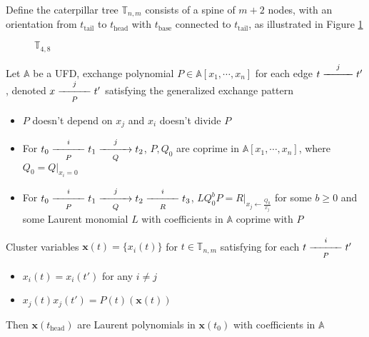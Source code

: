 \documentclass[main]{subfiles}
\begin{document}
\begin{lemma}\label{Caterpillar lemma}
Define the caterpillar tree $\mathbb T_{n,m}$ consists of a spine of $m+2$ nodes, with an orientation from $t_\mathrm{tail}$ to $t_\mathrm{head}$ with $t_\mathrm{base}$ connected to $t_\mathrm{tail}$, as illustrated in Figure \ref{T4,8} \par
\begin{figure}[h!]
\centering
{}
\caption{$\mathbb T_{4,8}$}\label{T4,8}
\end{figure}
Let $\mathbb A$ be a UFD, exchange polynomial $P\in\mathbb A[x_1,\cdots,x_n]$ for each edge $t\xedge jt'$, denoted $x\xedge[P]{j}t'$ satisfying the generalized exchange pattern
\begin{itemize}
\item $P$ doesn't depend on $x_j$ and $x_i$ doesn't divide $P$
\item For $t_0\xedge[P]it_1\xdirectededge[Q]jt_2$, $P,Q_0$ are coprime in $\mathbb A[x_1,\cdots,x_n]$, where $Q_0=Q|_{x_i=0}$
\item For $t_0\xedge[P]{i}t_1\xdirectededge[Q]{j}t_2\xedge[R]{i}t_3$, $LQ_0^bP=R|_{x_j\leftarrow \frac{Q_0}{x_j}}$ for some $b\geq0$ and some Laurent monomial $L$ with coefficients in $\mathbb A$ coprime with $P$
\end{itemize}
Cluster variables $\mathbf x(t)=\{x_i(t)\}$ for $t\in\mathbb T_{n,m}$ satisfying for each $t\xedge[P]it'$
\begin{itemize}
\item $x_i(t)=x_i(t')$ for any $i\neq j$
\item $x_j(t)x_j(t')=P(t)(\mathbf x(t))$
\end{itemize}
Then $\mathbf x(t_\mathrm{head})$ are Laurent polynomials in $\mathbf x(t_0)$ with coefficients in $\mathbb A$
\end{lemma}
\end{document}
